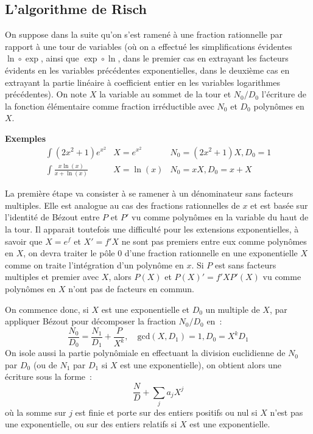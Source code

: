 \documentclass[a4paper,11pt]{article}
\begin{document}
\begin{giacjshere}
\subsection{L'algorithme de Risch} \label{sec:risch}
On suppose dans la suite qu'on s'est ramené à une fraction rationnelle
par rapport à une tour de variables (où on a effectué les simplifications
évidentes $\ln \circ \exp$, ainsi que $\exp \circ \ln$, dans le
premier cas en extrayant les facteurs évidents en les variables
précédentes exponentielles, dans le deuxième cas en extrayant la
partie linéaire à coefficient entier en les variables logarithmes
précédentes).
On note $X$ la variable au sommet de la tour et $N_0/D_0$ l'écriture
de la fonction élémentaire comme fraction irréductible avec
$N_0$ et $D_0$ polynômes en $X$.

{\bf Exemples}\\
\begin{eqnarray*}
\int (2x^2+1) e^{x^2} & X=e^{x^2} & N_0=(2x^2+1) X, D_0=1 \\
\int \frac{x \ln(x)}{x+\ln(x)} & X=\ln(x) & N_0=xX, D_0=x+X
\end{eqnarray*}

La première étape va consister à se ramener à un dénominateur sans facteurs
multiples. Elle est analogue au cas des fractions
rationnelles de $x$ et est basée sur l'identité de Bézout entre
$P$ et $P'$ vu comme polynômes en la variable du haut de la tour. 
Il apparait toutefois une difficulté pour les
extensions exponentielles, à savoir que $X=e^f$ et $X'=f' X$
ne sont pas premiers entre eux comme polynômes en $X$, on devra
traiter le pôle 0 d'une fraction rationnelle en une exponentielle $X$ comme
on traite l'intégration d'un polynôme en $x$.
Si $P$ est sans facteurs multiples et premier avec $X$, alors
$P(X)$ et $P(X)'=f' X P'(X)$ vu comme
polynômes en $X$ n'ont pas de facteurs en commun.

On commence donc, si $X$ est une exponentielle et $D_0$ un
multiple de $X$, par appliquer Bézout pour décomposer la fraction $N_0/D_0$
en~:
\[ \frac{N_0}{D_0}
=\frac{N_1}{D_1} + \frac{P}{X^{k} } , \quad \mbox{gcd}(X,D_1)=1, D_0=X^k D_1\]
On isole aussi la partie polynômiale en effectuant
la division euclidienne de $N_0$ par $D_0$ (ou de $N_1$ par $D_1$ si $X$
est une exponentielle),
on obtient alors une écriture sous la forme~:
\[ \frac{N}{D} + \sum_j a_j X^j\]
où la somme sur $j$ est finie et porte sur des entiers positifs ou nul 
si $X$ n'est pas une exponentielle, ou sur des entiers relatifs si $X$
est une exponentielle.


\end{giacjshere}
\end{document}
